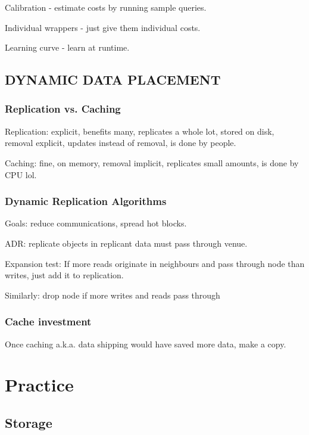 \documentclass{article}
\begin{document}
		Calibration - estimate costs by running sample queries.
		
		Individual wrappers - just give them individual costs.
		
		Learning curve - learn at runtime.
		
		\subsection{DYNAMIC DATA PLACEMENT}
		
			\subsubsection{ Replication vs. Caching}
			
				Replication: explicit, benefits many, replicates a whole lot, stored on disk, removal explicit, updates instead of removal, is done by people.
				
				Caching: fine, on memory, removal implicit, replicates small amounts, is done by CPU lol.
				
			\subsubsection{Dynamic Replication Algorithms}
			
				Goals: reduce communications, spread hot blocks.
				
				ADR: replicate objects in replicant data must pass through venue.
				
				Expansion test: If more reads originate in neighbours and pass through node than writes, just add it to replication.
				
				Similarly: drop node if more writes and reads pass through
				
			\subsubsection{Cache investment}
			
				Once caching a.k.a. data shipping would have saved more data, make a copy.
				
				
\newpage\phantom{asd}
\newpage

\section{Practice}

	\subsection{Storage}
\end{document}
